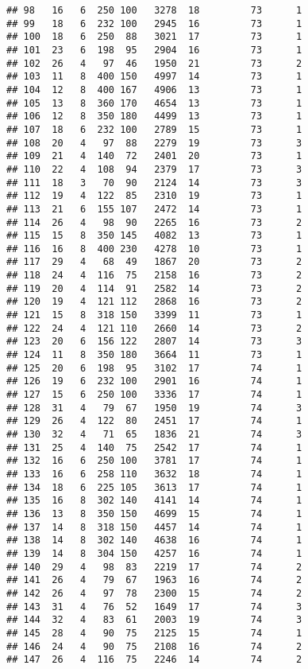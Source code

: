 \documentclass[]{article}
\begin{document}
\begin{verbatim}
## 98   16   6  250 100   3278  18         73      1
## 99   18   6  232 100   2945  16         73      1
## 100  18   6  250  88   3021  17         73      1
## 101  23   6  198  95   2904  16         73      1
## 102  26   4   97  46   1950  21         73      2
## 103  11   8  400 150   4997  14         73      1
## 104  12   8  400 167   4906  13         73      1
## 105  13   8  360 170   4654  13         73      1
## 106  12   8  350 180   4499  13         73      1
## 107  18   6  232 100   2789  15         73      1
## 108  20   4   97  88   2279  19         73      3
## 109  21   4  140  72   2401  20         73      1
## 110  22   4  108  94   2379  17         73      3
## 111  18   3   70  90   2124  14         73      3
## 112  19   4  122  85   2310  19         73      1
## 113  21   6  155 107   2472  14         73      1
## 114  26   4   98  90   2265  16         73      2
## 115  15   8  350 145   4082  13         73      1
## 116  16   8  400 230   4278  10         73      1
## 117  29   4   68  49   1867  20         73      2
## 118  24   4  116  75   2158  16         73      2
## 119  20   4  114  91   2582  14         73      2
## 120  19   4  121 112   2868  16         73      2
## 121  15   8  318 150   3399  11         73      1
## 122  24   4  121 110   2660  14         73      2
## 123  20   6  156 122   2807  14         73      3
## 124  11   8  350 180   3664  11         73      1
## 125  20   6  198  95   3102  17         74      1
## 126  19   6  232 100   2901  16         74      1
## 127  15   6  250 100   3336  17         74      1
## 128  31   4   79  67   1950  19         74      3
## 129  26   4  122  80   2451  17         74      1
## 130  32   4   71  65   1836  21         74      3
## 131  25   4  140  75   2542  17         74      1
## 132  16   6  250 100   3781  17         74      1
## 133  16   6  258 110   3632  18         74      1
## 134  18   6  225 105   3613  17         74      1
## 135  16   8  302 140   4141  14         74      1
## 136  13   8  350 150   4699  15         74      1
## 137  14   8  318 150   4457  14         74      1
## 138  14   8  302 140   4638  16         74      1
## 139  14   8  304 150   4257  16         74      1
## 140  29   4   98  83   2219  17         74      2
## 141  26   4   79  67   1963  16         74      2
## 142  26   4   97  78   2300  15         74      2
## 143  31   4   76  52   1649  17         74      3
## 144  32   4   83  61   2003  19         74      3
## 145  28   4   90  75   2125  15         74      1
## 146  24   4   90  75   2108  16         74      2
## 147  26   4  116  75   2246  14         74      2

\end{verbatim}
\end{document}
